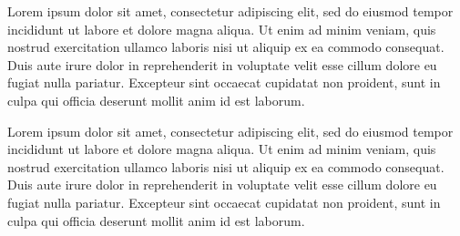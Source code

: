 \documentclass[letterpaper]{article}
\begin{document}
Lorem ipsum dolor sit amet, consectetur adipiscing elit, sed do eiusmod tempor incididunt ut labore et dolore magna aliqua. Ut enim ad minim veniam, quis nostrud exercitation ullamco laboris nisi ut aliquip ex ea commodo consequat. Duis aute irure dolor in reprehenderit in voluptate velit esse cillum dolore eu fugiat nulla pariatur. Excepteur sint occaecat cupidatat non proident, sunt in culpa qui officia deserunt mollit anim id est laborum. 

\begin{table}[!hbt]
\vskip 0.25cm
\caption{Sample table caption.}
\end{table}

Lorem ipsum dolor sit amet, consectetur adipiscing elit, sed do eiusmod tempor incididunt ut labore et dolore magna aliqua. Ut enim ad minim veniam, quis nostrud exercitation ullamco laboris nisi ut aliquip ex ea commodo consequat. Duis aute irure dolor in reprehenderit in voluptate velit esse cillum dolore eu fugiat nulla pariatur. Excepteur sint occaecat cupidatat non proident, sunt in culpa qui officia deserunt mollit anim id est laborum. 

\footnotesize


\end{document}
